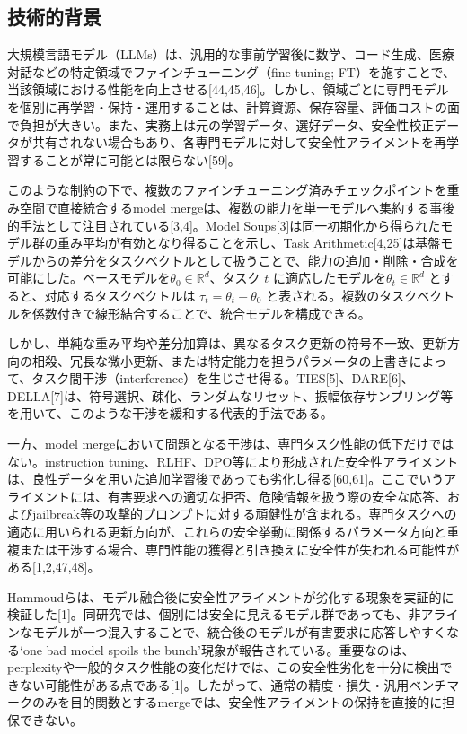 \documentclass{article}
\begin{document}
\subsection{技術的背景}
大規模言語モデル（LLMs）は、汎用的な事前学習後に数学、コード生成、医療対話などの特定領域でファインチューニング（fine-tuning; FT）を施すことで、当該領域における性能を向上させる[44,45,46]。しかし、領域ごとに専門モデルを個別に再学習・保持・運用することは、計算資源、保存容量、評価コストの面で負担が大きい。また、実務上は元の学習データ、選好データ、安全性校正データが共有されない場合もあり、各専門モデルに対して安全性アライメントを再学習することが常に可能とは限らない[59]。

このような制約の下で、複数のファインチューニング済みチェックポイントを重み空間で直接統合するmodel mergeは、複数の能力を単一モデルへ集約する事後的手法として注目されている[3,4]。Model Soups[3]は同一初期化から得られたモデル群の重み平均が有効となり得ることを示し、Task Arithmetic[4,25]は基盤モデルからの差分をタスクベクトルとして扱うことで、能力の追加・削除・合成を可能にした。ベースモデルを\(\theta_0 \in \mathbb{R}^d\)、タスク \(t\) に適応したモデルを\(\theta_t \in \mathbb{R}^d\) とすると、対応するタスクベクトルは \(\tau_t = \theta_t - \theta_0\) と表される。複数のタスクベクトルを係数付きで線形結合することで、統合モデルを構成できる。

しかし、単純な重み平均や差分加算は、異なるタスク更新の符号不一致、更新方向の相殺、冗長な微小更新、または特定能力を担うパラメータの上書きによって、タスク間干渉（interference）を生じさせ得る。TIES[5]、DARE[6]、DELLA[7]は、符号選択、疎化、ランダムなリセット、振幅依存サンプリング等を用いて、このような干渉を緩和する代表的手法である。

一方、model mergeにおいて問題となる干渉は、専門タスク性能の低下だけではない。instruction tuning、RLHF、DPO等により形成された安全性アライメントは、良性データを用いた追加学習後であっても劣化し得る[60,61]。ここでいうアライメントには、有害要求への適切な拒否、危険情報を扱う際の安全な応答、およびjailbreak等の攻撃的プロンプトに対する頑健性が含まれる。専門タスクへの適応に用いられる更新方向が、これらの安全挙動に関係するパラメータ方向と重複または干渉する場合、専門性能の獲得と引き換えに安全性が失われる可能性がある[1,2,47,48]。

Hammoudらは、モデル融合後に安全性アライメントが劣化する現象を実証的に検証した[1]。同研究では、個別には安全に見えるモデル群であっても、非アラインなモデルが一つ混入することで、統合後のモデルが有害要求に応答しやすくなる`one bad model spoils the bunch'現象が報告されている。重要なのは、perplexityや一般的タスク性能の変化だけでは、この安全性劣化を十分に検出できない可能性がある点である[1]。したがって、通常の精度・損失・汎用ベンチマークのみを目的関数とするmergeでは、安全性アライメントの保持を直接的に担保できない。
\end{document}
